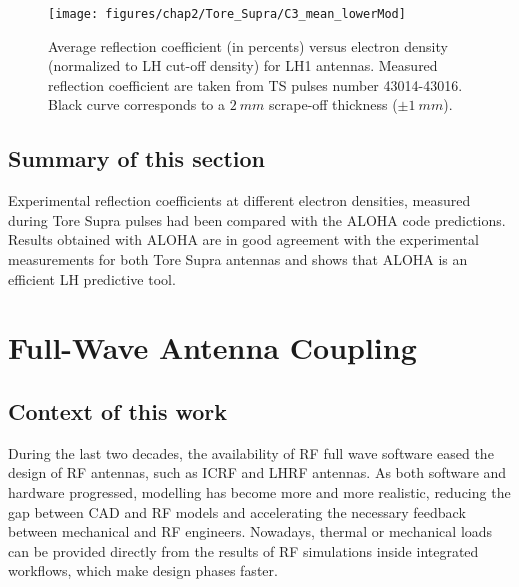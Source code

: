 \begin{figure}[h]
	\centering
	\texttt{[image: figures/chap2/Tore\_Supra/C3\_mean\_lowerMod]}
	\caption{Average reflection  coefficient (in percents) versus electron density (normalized to LH cut-off density) for LH1 antennas. Measured reflection  coefficient are taken from TS pulses number 43014-43016. Black curve corresponds to a $2~mm$ scrape-off thickness ($\pm 1~mm$).}
	\label{fig:MarkII_mean_RC}
\end{figure}





\subsection{Summary of this section}

Experimental reflection coefficients at different electron densities, measured during Tore Supra pulses had been compared with the ALOHA code predictions. Results obtained with ALOHA are in good agreement with the experimental measurements for both Tore Supra antennas and shows that ALOHA is an efficient LH predictive tool. 

\section{Full-Wave Antenna Coupling}\label{sec:LHCD_FW_antena_coupling}
\subsection{Context of this work}
During the last two decades, the availability of RF full wave software eased the design of RF antennas, such as ICRF and LHRF antennas. As both software and hardware progressed, modelling has become more and more realistic, reducing the gap between CAD and RF models and accelerating the necessary feedback between mechanical and RF engineers. Nowadays, thermal or mechanical loads can be provided directly from the results of RF simulations inside integrated workflows, which make design phases faster.

